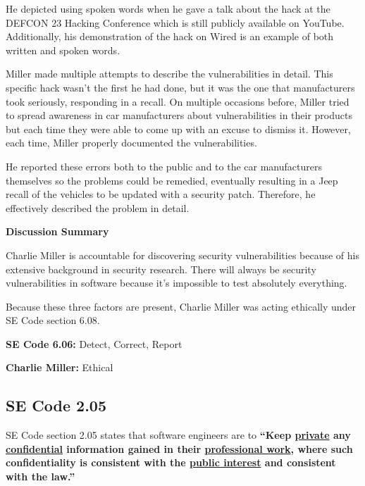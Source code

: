\documentclass[12pt]{article}
\begin{document}
\begin{multicols}{2}
He depicted using spoken words when he gave a talk about the hack at the DEFCON 23 Hacking Conference which is still publicly available on YouTube. \cite{youtube} Additionally, his demonstration of the hack on Wired is an example of both written and spoken words.\cite{wired}

Miller made multiple attempts to describe the vulnerabilities in detail. This specific hack wasn't the first he had done, but it was the one that manufacturers took seriously, responding in a recall. \cite{recall} On multiple occasions before, Miller tried to spread awareness in car manufacturers about vulnerabilities in their products but each time they were able to come up with an excuse to dismiss it.\cite {officialPaper} However, each time, Miller properly documented the vulnerabilities.

He reported these errors both to the public and to the car manufacturers themselves so the problems could be remedied, eventually resulting in a Jeep recall of the vehicles to be updated with a security patch.\cite{recall} Therefore, he effectively described the problem in detail.

\vspace{.5cm}\hspace{-.5cm}\textbf{Discussion Summary}\vspace{.2cm}

Charlie Miller is accountable for discovering security vulnerabilities because of his extensive background in security research.\cite{linkedin} There will always be security vulnerabilities in software because it's impossible to test absolutely everything. \cite{turner} 

Because these three factors are present, Charlie Miller was acting ethically under SE Code section 6.08.

\begin{framed}
\hspace{-.67cm}\textbf{SE Code 6.06:} Detect, Correct, Report 

\hspace{-.67cm}\textbf{Charlie Miller:} Ethical
\end{framed}


\subsection{SE Code 2.05}

SE Code section 2.05 states that software engineers are to \textbf{``Keep \underline{private} any \underline{confidential} information gained in their \underline{professional work}, where such confidentiality is consistent with the \underline{public interest} and consistent with the law.''}\cite{seCode}


\end{multicols}
\end{document}
